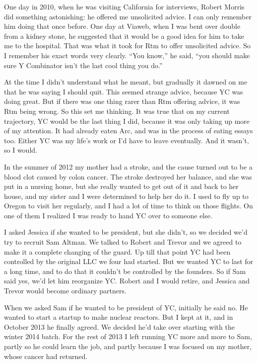 One day in 2010, when he was visiting California for interviews, Robert
Morris did something astonishing: he offered me unsolicited advice. I
can only remember him doing that once before. One day at Viaweb, when I
was bent over double from a kidney stone, he suggested that it would be
a good idea for him to take me to the hospital. That was what it took
for Rtm to offer unsolicited advice. So I remember his exact words very
clearly. ``You know,'' he said, ``you should make sure Y Combinator
isn't the last cool thing you do.''

At the time I didn't understand what he meant, but gradually it dawned
on me that he was saying I should quit. This seemed strange advice,
because YC was doing great. But if there was one thing rarer than Rtm
offering advice, it was Rtm being wrong. So this set me thinking. It was
true that on my current trajectory, YC would be the last thing I did,
because it was only taking up more of my attention. It had already eaten
Arc, and was in the process of eating essays too. Either YC was my
life's work or I'd have to leave eventually. And it wasn't, so I would.

In the summer of 2012 my mother had a stroke, and the cause turned out
to be a blood clot caused by colon cancer. The stroke destroyed her
balance, and she was put in a nursing home, but she really wanted to get
out of it and back to her house, and my sister and I were determined to
help her do it. I used to fly up to Oregon to visit her regularly, and I
had a lot of time to think on those flights. On one of them I realized I
was ready to hand YC over to someone else.

I asked Jessica if she wanted to be president, but she didn't, so we
decided we'd try to recruit Sam Altman. We talked to Robert and Trevor
and we agreed to make it a complete changing of the guard. Up till that
point YC had been controlled by the original LLC we four had started.
But we wanted YC to last for a long time, and to do that it couldn't be
controlled by the founders. So if Sam said yes, we'd let him reorganize
YC. Robert and I would retire, and Jessica and Trevor would become
ordinary partners.

When we asked Sam if he wanted to be president of YC, initially he said
no. He wanted to start a startup to make nuclear reactors. But I kept at
it, and in October 2013 he finally agreed. We decided he'd take over
starting with the winter 2014 batch. For the rest of 2013 I left running
YC more and more to Sam, partly so he could learn the job, and partly
because I was focused on my mother, whose cancer had returned.

